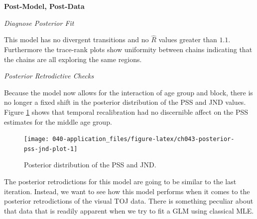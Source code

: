 \documentclass[11pt, oneside, openany]{scrbook}
\newenvironment{Shaded}{\begin{snugshade}}{\end{snugshade}}
\newcommand{\DataTypeTok}[1]{\textcolor[rgb]{0.13,0.29,0.53}{#1}}
\newcommand{\DecValTok}[1]{\textcolor[rgb]{0.00,0.00,0.81}{#1}}
\newcommand{\KeywordTok}[1]{\textcolor[rgb]{0.13,0.29,0.53}{\textbf{#1}}}
\newcommand{\NormalTok}[1]{#1}
\newcommand{\OperatorTok}[1]{\textcolor[rgb]{0.81,0.36,0.00}{\textbf{#1}}}
\newcommand{\StringTok}[1]{\textcolor[rgb]{0.31,0.60,0.02}{#1}}
\begin{document}
\textbf{Post-Model, Post-Data}

\emph{Diagnose Posterior Fit}

This model has no divergent transitions and no \(\hat{R}\) values greater than \(1.1\). Furthermore the trace-rank plots show uniformity between chains indicating that the chains are all exploring the same regions.

\emph{Posterior Retrodictive Checks}

Because the model now allows for the interaction of age group and block, there is no longer a fixed shift in the posterior distribution of the PSS and JND values. Figure \ref{fig:ch043-posterior-pss-jnd-plot} shows that temporal recalibration had no discernible affect on the PSS estimates for the middle age group.

\begin{figure}

{\centering \texttt{[image: 040-application\_files/figure-latex/ch043-posterior-pss-jnd-plot-1]} 

}

\caption{Posterior distribution of the PSS and JND.}\label{fig:ch043-posterior-pss-jnd-plot}
\end{figure}

The posterior retrodictions for this model are going to be similar to the last iteration. Instead, we want to see how this model performs when it comes to the posterior retrodictions of the visual TOJ data. There is something peculiar about that data that is readily apparent when we try to fit a GLM using classical MLE.


\begin{Shaded}
\end{Shaded}
\end{document}
